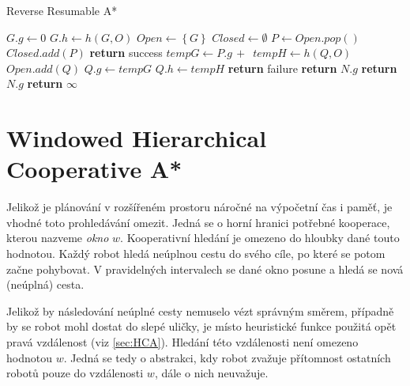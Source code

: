 \begin{algorithm}[H]
	\caption{Reverse Resumable A*}
	\label{alg:RRA}
	\begin{algorithmic}[1]
			\State $G.g\gets 0$
			\State $G.h\gets h(G,O)$
			\State $Open\gets\left\{ G \right\}$
			\State $Closed\gets\emptyset$
			\State {}
		\EndFunction
		\Statex
				\State $P\gets Open.pop()$
				\State $Closed.add(P)$
					\State \textbf{return} success
				\EndIf
					\State $tempG\gets P.g\,+\,$
					\State $tempH\gets h(Q,O)$
						\State $Open.add(Q)$
					\EndIf
						\State $Q.g\gets tempG$
						\State $Q.h\gets tempH$
					\EndIf
				\EndFor
			\EndWhile
			\State \textbf{return} failure
		\EndFunction
		\Statex
				\State \textbf{return} $N.g$
			\EndIf
				\State \textbf{return} $N.g$
			\EndIf
			\State \textbf{return} $\infty$
		\EndFunction
	\end{algorithmic}
\end{algorithm}

\clearpage
\section{Windowed Hierarchical Cooperative A*}
Jelikož je plánování v rozšířeném prostoru náročné na výpočetní čas i paměť, je vhodné toto prohledávání omezit. Jedná se o horní hranici potřebné kooperace, kterou nazveme \emph{okno} $w$. Kooperativní hledání je omezeno do hloubky dané touto hodnotou. Každý robot hledá neúplnou cestu do svého cíle, po které se potom začne pohybovat. V pravidelných intervalech se dané okno posune a hledá se nová (neúplná) cesta. 

Jelikož by následování neúplné cesty nemuselo vézt správným směrem, případně by se robot mohl dostat do slepé uličky, je místo heuristické funkce použitá opět pravá vzdálenost (viz \ref{sec:HCA}). Hledání této vzdálenosti není omezeno hodnotou $w$. Jedná se tedy o abstrakci, kdy robot zvažuje přítomnost ostatních robotů pouze do vzdálenosti $w$, dále o nich neuvažuje.

